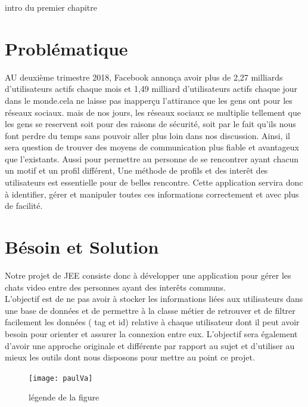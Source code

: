 \documentclass[oneside,12pt,a4paper]{book}
\begin{document}
intro du premier chapitre

\section{Problématique}



 AU deuxième trimestre 2018, Facebook annonça avoir plus de 2,27 milliards d'utilisateurs actifs chaque mois et 1,49 milliard d'utilisateurs actifs chaque jour dans le monde.cela ne laisse pas inapperçu l'attirance que les gens ont pour les réseaux sociaux. mais de nos jours, les réseaux sociaux se multiplie tellement que les gens se reservent soit pour des raisons de sécurité, soit par le fait qu'ils nous font perdre du temps sans pouvoir aller plus loin dans nos discussion. Ainsi, il sera question de trouver des moyens de communication plus fiable et avantageux que l'existants. 
Aussi pour permettre au personne de se rencontrer ayant chacun un motif et un profil différent, Une méthode de profils et des interêt des utilisateurs est essentielle pour de belles rencontre. Cette application servira donc à identifier, gérer et manipuler toutes ces informations correctement et avec plus de facilité.

\section{Bésoin et Solution}

Notre projet de JEE consiste donc à développer une application pour gérer les chats video entre des personnes ayant des interêts communs. \\
  L’objectif est de ne pas avoir à stocker les informations liées aux utilisateurs dans une base de données et de permettre à la classe métier de retrouver et de filtrer facilement les données ( tag et id) relative à chaque utilisateur dont il peut avoir besoin pour orienter et assurer la connexion entre eux. L’objectif sera également d’avoir une approche originale et différente par rapport au sujet et d’utiliser au mieux les outils dont nous disposons pour mettre au point ce projet.


\begin{figure}[ht]
\centering\texttt{[image: paulVa]}
\caption{légende de la figure}
\end{figure}



\bigskip

  
\end{document}
